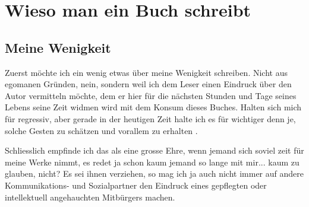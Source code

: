 \documentclass[a5paper,12pt,fleqn,titlepage,twoside]{book}
\begin{document}
\chapter{Wieso man ein Buch schreibt}
\section{Meine Wenigkeit}
Zuerst möchte ich ein wenig etwas über meine Wenigkeit schreiben. Nicht aus egomanen Gründen, nein, sondern weil ich dem Leser einen Eindruck über den Autor vermitteln möchte, dem er hier für die nächsten Stunden und Tage seines Lebens seine Zeit widmen wird mit dem Konsum dieses Buches. Halten sich mich für regressiv, aber gerade in der heutigen Zeit halte ich es für wichtiger denn je, solche Gesten zu schätzen und vorallem zu erhalten	.

Schliesslich empfinde ich das als eine grosse Ehre, wenn jemand sich soviel zeit für meine Werke nimmt, es redet ja schon kaum jemand so lange mit mir... kaum zu glauben, nicht? Es sei ihnen verziehen, so mag ich ja auch nicht immer auf andere Kommunikations- und Sozialpartner den Eindruck eines gepflegten oder intellektuell angehauchten Mitbürgers machen.
\end{document}
